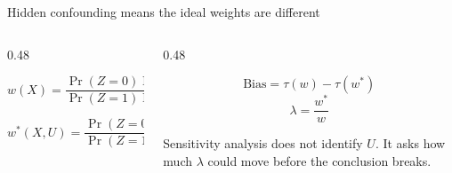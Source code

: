 \documentclass[aspectratio=169,10pt]{ctexbeamer}
\begin{document}
\begin{frame}{Hidden confounding means the ideal weights are different}
  \begin{columns}[T,totalwidth=\textwidth]
    \begin{column}{0.48\textwidth}
      \begin{bluebox}[title=Observable weights]
        \[
          w(X)=
          \frac{\Pr(Z=0)\Pr(Z=1\mid X)}
              {\Pr(Z=1)\Pr(Z=0\mid X)}
        \]
      \end{bluebox}
      \vspace{0.3cm}
      \begin{redbox}[title=Ideal weights]
        \[
          w^*(X,U)=
          \frac{\Pr(Z=0)\Pr(Z=1\mid X,U)}
              {\Pr(Z=1)\Pr(Z=0\mid X,U)}
        \]
      \end{redbox}
    \end{column}
    \begin{column}{0.48\textwidth}
      \begin{yellowbox}[title=Bias is a weight problem]
        \[
          \mathrm{Bias}=\tau(w)-\tau(w^*)
        \]
        \[
          \lambda=\frac{w^*}{w}
        \]
      \end{yellowbox}
      \vspace{0.25cm}
      \begin{graybox}
        Sensitivity analysis does not identify $U$. It asks how much $\lambda$ could move before the conclusion breaks.
      \end{graybox}
    \end{column}
  \end{columns}
\end{frame}
\end{document}
